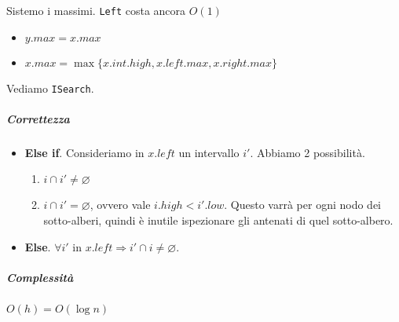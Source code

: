 Sistemo i massimi. \texttt{Left} costa ancora $O(1)$
\begin{itemize}[noitemsep]
    \item $y.max = x.max$
    \item $x.max = \max \{ x.int.high, x.left.max, x.right.max \}$
\end{itemize}

Vediamo \texttt{ISearch}.
 

\subparagraph{Correttezza} 
\begin{itemize}
    \item \textbf{Else if}. Consideriamo in $x.left$ un intervallo $i'$.
    Abbiamo 2 possibilità.
    \begin{enumerate}[label=($\arabic*$)]
        \item $i \cap i' \neq \varnothing$
        \item $i \cap i' = \varnothing$, ovvero vale $i.high < i'.low$. 
        Questo varrà per ogni nodo dei sotto-alberi, quindi è inutile ispezionare
        gli antenati di quel sotto-albero.
    \end{enumerate}
    \item \textbf{Else}. $\forall i'$ in $x.left \Rightarrow i' \cap i \neq \varnothing$.
\end{itemize}

\subparagraph{Complessità} $O(h) = O(\log n)$